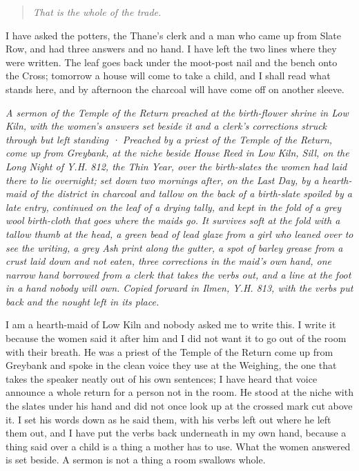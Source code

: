 \documentclass{design/chronicle}
\begin{document}
\begin{quote}\itshape That is the whole of the trade.\end{quote}

I have asked the potters, the Thane’s clerk and a man who came up from Slate Row, and had three answers and no hand. I have left the two lines where they were written. The leaf goes back under the moot-post nail and the bench onto the Cross; tomorrow a house will come to take a child, and I shall read what stands here, and by afternoon the charcoal will have come off on another sleeve.

\clearpage{}
{\centering\FellFont\itshape\footnotesize\color{faded} A sermon of the Temple of the Return preached at the birth-flower shrine in Low Kiln, with the women’s answers set beside it and a clerk’s corrections struck through but left standing · Preached by a priest of the Temple of the Return, come up from Greybank, at the niche beside House Reed in Low Kiln, Sill, on the Long Night of Y.H. 812, the Thin Year, over the birth-slates the women had laid there to lie overnight; set down two mornings after, on the Last Day, by a hearth-maid of the district in charcoal and tallow on the back of a birth-slate spoiled by a late entry, continued on the leaf of a drying tally, and kept in the fold of a grey wool birth-cloth that goes where the maids go. It survives soft at the fold with a tallow thumb at the head, a green bead of lead glaze from a girl who leaned over to see the writing, a grey Ash print along the gutter, a spot of barley grease from a crust laid down and not eaten, three corrections in the maid’s own hand, one narrow hand borrowed from a clerk that takes the verbs out, and a line at the foot in a hand nobody will own. Copied forward in Ilmen, Y.H. 813, with the verbs put back and the nought left in its place.\par}\medskip
I am a hearth-maid of Low Kiln and nobody asked me to write this. I write it because the women said it after him and I did not want it to go out of the room with their breath. He was a priest of the Temple of the Return come up from Greybank and spoke in the clean voice they use at the Weighing, the one that takes the speaker neatly out of his own sentences; I have heard that voice announce a whole return for a person not in the room. He stood at the niche with the slates under his hand and did not once look up at the crossed mark cut above it. I set his words down as he said them, with his verbs left out where he left them out, and I have put the verbs back underneath in my own hand, because a thing said over a child is a thing a mother has to use. What the women answered is set beside. A sermon is not a thing a room swallows whole.
\end{document}

